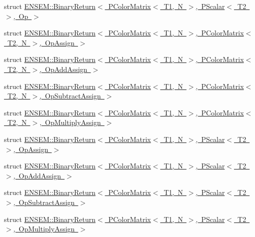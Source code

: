 \begin{DoxyCompactItemize}
\item 
struct \mbox{\hyperlink{structENSEM_1_1BinaryReturn_3_01PColorMatrix_3_01T1_00_01N_01_4_00_01PScalar_3_01T2_01_4_00_01Op_01_4}{E\+N\+S\+E\+M\+::\+Binary\+Return$<$ P\+Color\+Matrix$<$ T1, N $>$, P\+Scalar$<$ T2 $>$, Op $>$}}
\item 
struct \mbox{\hyperlink{structENSEM_1_1BinaryReturn_3_01PColorMatrix_3_01T1_00_01N_01_4_00_01PColorMatrix_3_01T2_00_01N_01_4_00_01OpAssign_01_4}{E\+N\+S\+E\+M\+::\+Binary\+Return$<$ P\+Color\+Matrix$<$ T1, N $>$, P\+Color\+Matrix$<$ T2, N $>$, Op\+Assign $>$}}
\item 
struct \mbox{\hyperlink{structENSEM_1_1BinaryReturn_3_01PColorMatrix_3_01T1_00_01N_01_4_00_01PColorMatrix_3_01T2_00_01N_01_4_00_01OpAddAssign_01_4}{E\+N\+S\+E\+M\+::\+Binary\+Return$<$ P\+Color\+Matrix$<$ T1, N $>$, P\+Color\+Matrix$<$ T2, N $>$, Op\+Add\+Assign $>$}}
\item 
struct \mbox{\hyperlink{structENSEM_1_1BinaryReturn_3_01PColorMatrix_3_01T1_00_01N_01_4_00_01PColorMatrix_3_01T2_00_01N_01_4_00_01OpSubtractAssign_01_4}{E\+N\+S\+E\+M\+::\+Binary\+Return$<$ P\+Color\+Matrix$<$ T1, N $>$, P\+Color\+Matrix$<$ T2, N $>$, Op\+Subtract\+Assign $>$}}
\item 
struct \mbox{\hyperlink{structENSEM_1_1BinaryReturn_3_01PColorMatrix_3_01T1_00_01N_01_4_00_01PColorMatrix_3_01T2_00_01N_01_4_00_01OpMultiplyAssign_01_4}{E\+N\+S\+E\+M\+::\+Binary\+Return$<$ P\+Color\+Matrix$<$ T1, N $>$, P\+Color\+Matrix$<$ T2, N $>$, Op\+Multiply\+Assign $>$}}
\item 
struct \mbox{\hyperlink{structENSEM_1_1BinaryReturn_3_01PColorMatrix_3_01T1_00_01N_01_4_00_01PScalar_3_01T2_01_4_00_01OpAssign_01_4}{E\+N\+S\+E\+M\+::\+Binary\+Return$<$ P\+Color\+Matrix$<$ T1, N $>$, P\+Scalar$<$ T2 $>$, Op\+Assign $>$}}
\item 
struct \mbox{\hyperlink{structENSEM_1_1BinaryReturn_3_01PColorMatrix_3_01T1_00_01N_01_4_00_01PScalar_3_01T2_01_4_00_01OpAddAssign_01_4}{E\+N\+S\+E\+M\+::\+Binary\+Return$<$ P\+Color\+Matrix$<$ T1, N $>$, P\+Scalar$<$ T2 $>$, Op\+Add\+Assign $>$}}
\item 
struct \mbox{\hyperlink{structENSEM_1_1BinaryReturn_3_01PColorMatrix_3_01T1_00_01N_01_4_00_01PScalar_3_01T2_01_4_00_01OpSubtractAssign_01_4}{E\+N\+S\+E\+M\+::\+Binary\+Return$<$ P\+Color\+Matrix$<$ T1, N $>$, P\+Scalar$<$ T2 $>$, Op\+Subtract\+Assign $>$}}
\item 
struct \mbox{\hyperlink{structENSEM_1_1BinaryReturn_3_01PColorMatrix_3_01T1_00_01N_01_4_00_01PScalar_3_01T2_01_4_00_01OpMultiplyAssign_01_4}{E\+N\+S\+E\+M\+::\+Binary\+Return$<$ P\+Color\+Matrix$<$ T1, N $>$, P\+Scalar$<$ T2 $>$, Op\+Multiply\+Assign $>$}}

\end{DoxyCompactItemize}
